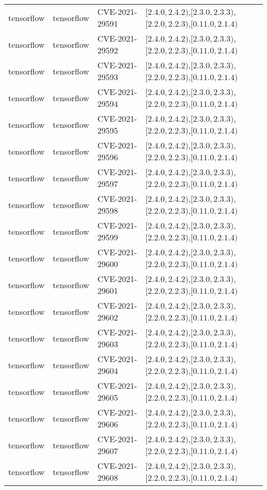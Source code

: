 \begin{tabular}{llll}
tensorflow & tensorflow & CVE-2021-29591 & $[2.4.0,2.4.2)$,$[2.3.0,2.3.3)$,$[2.2.0,2.2.3)$,$[0.11.0,2.1.4)$ \\
tensorflow & tensorflow & CVE-2021-29592 & $[2.4.0,2.4.2)$,$[2.3.0,2.3.3)$,$[2.2.0,2.2.3)$,$[0.11.0,2.1.4)$ \\
tensorflow & tensorflow & CVE-2021-29593 & $[2.4.0,2.4.2)$,$[2.3.0,2.3.3)$,$[2.2.0,2.2.3)$,$[0.11.0,2.1.4)$ \\
tensorflow & tensorflow & CVE-2021-29594 & $[2.4.0,2.4.2)$,$[2.3.0,2.3.3)$,$[2.2.0,2.2.3)$,$[0.11.0,2.1.4)$ \\
tensorflow & tensorflow & CVE-2021-29595 & $[2.4.0,2.4.2)$,$[2.3.0,2.3.3)$,$[2.2.0,2.2.3)$,$[0.11.0,2.1.4)$ \\
tensorflow & tensorflow & CVE-2021-29596 & $[2.4.0,2.4.2)$,$[2.3.0,2.3.3)$,$[2.2.0,2.2.3)$,$[0.11.0,2.1.4)$ \\
tensorflow & tensorflow & CVE-2021-29597 & $[2.4.0,2.4.2)$,$[2.3.0,2.3.3)$,$[2.2.0,2.2.3)$,$[0.11.0,2.1.4)$ \\
tensorflow & tensorflow & CVE-2021-29598 & $[2.4.0,2.4.2)$,$[2.3.0,2.3.3)$,$[2.2.0,2.2.3)$,$[0.11.0,2.1.4)$ \\
tensorflow & tensorflow & CVE-2021-29599 & $[2.4.0,2.4.2)$,$[2.3.0,2.3.3)$,$[2.2.0,2.2.3)$,$[0.11.0,2.1.4)$ \\
tensorflow & tensorflow & CVE-2021-29600 & $[2.4.0,2.4.2)$,$[2.3.0,2.3.3)$,$[2.2.0,2.2.3)$,$[0.11.0,2.1.4)$ \\
tensorflow & tensorflow & CVE-2021-29601 & $[2.4.0,2.4.2)$,$[2.3.0,2.3.3)$,$[2.2.0,2.2.3)$,$[0.11.0,2.1.4)$ \\
tensorflow & tensorflow & CVE-2021-29602 & $[2.4.0,2.4.2)$,$[2.3.0,2.3.3)$,$[2.2.0,2.2.3)$,$[0.11.0,2.1.4)$ \\
tensorflow & tensorflow & CVE-2021-29603 & $[2.4.0,2.4.2)$,$[2.3.0,2.3.3)$,$[2.2.0,2.2.3)$,$[0.11.0,2.1.4)$ \\
tensorflow & tensorflow & CVE-2021-29604 & $[2.4.0,2.4.2)$,$[2.3.0,2.3.3)$,$[2.2.0,2.2.3)$,$[0.11.0,2.1.4)$ \\
tensorflow & tensorflow & CVE-2021-29605 & $[2.4.0,2.4.2)$,$[2.3.0,2.3.3)$,$[2.2.0,2.2.3)$,$[0.11.0,2.1.4)$ \\
tensorflow & tensorflow & CVE-2021-29606 & $[2.4.0,2.4.2)$,$[2.3.0,2.3.3)$,$[2.2.0,2.2.3)$,$[0.11.0,2.1.4)$ \\
tensorflow & tensorflow & CVE-2021-29607 & $[2.4.0,2.4.2)$,$[2.3.0,2.3.3)$,$[2.2.0,2.2.3)$,$[0.11.0,2.1.4)$ \\
tensorflow & tensorflow & CVE-2021-29608 & $[2.4.0,2.4.2)$,$[2.3.0,2.3.3)$,$[2.2.0,2.2.3)$,$[0.11.0,2.1.4)$ \\

\end{tabular}
